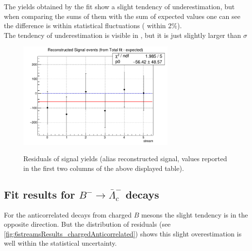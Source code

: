     The yields obtained by the fit show a slight tendency of underestimation, but when comparing the sums of them with the sum of expected 
    values one can see the difference is within statistical fluctuations ( within 2$\%$). 
   \\
   The tendency of underestimation is visible in , but it is just slightly larger than $\sigma$


   \begin{figure}[H]
    \centering
    {\includegraphics[width=0.70\textwidth]{04-SimultaneousFit/figs/6streamResults_chargedCorrelated_correct.png}}
    \caption{Residuals of signal yields (alias reconstructed signal, values reported in the first two columns of the above displayed table).}
    \label{fig:6streamsResults_chargedCorrelated}
    \end{figure}


\newpage    

\subsection{Fit results for $B^- \rightarrow \bar{\Lambda}_c^-$ decays}   

For the anticorrelated decays from charged $B$ mesons the slight tendency is in the opposite direction. But the distribution of residuals (see \cref{fig:6streamsResults_chargedAnticorrelated})
shows this slight overestimation is well within the statistical uncertainty.



